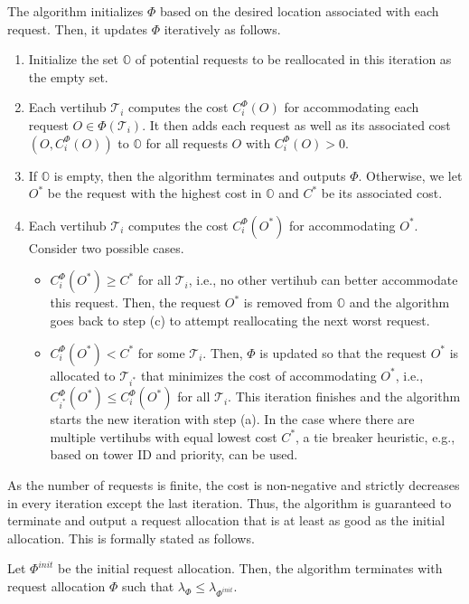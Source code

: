 The algorithm initializes $\Phi$ based on the desired location associated with each request. Then, it updates $\Phi$ iteratively as follows.
\begin{enumerate}
	\item Initialize the set $\mathbb{O}$ of potential requests to be reallocated in this iteration as the empty set.
	\item Each vertihub $\mathcal{T}_i$ computes the cost $C_i^\Phi(O)$ for accommodating each request $O \in \Phi(\mathcal{T}_i)$. It then adds each request as well as its associated cost $(O, C_i^\Phi(O))$ to $\mathbb{O}$ for all requests $O$ with $C_i^\Phi(O) > 0$.
	\item If $\mathbb{O}$ is empty, then the algorithm terminates and outputs $\Phi$. Otherwise, we let $O^*$ be the request with the highest cost in $\mathbb{O}$ and $C^*$ be its associated cost.
	\item Each vertihub $\mathcal{T}_i$ computes the cost $C_i^\Phi(O^*)$ for accommodating $O^*$. Consider two possible cases.
	\begin{itemize}
		\item $C_i^\Phi(O^*) \geq C^*$ for all $\mathcal{T}_i$, i.e., no other vertihub can better accommodate this request. Then, the request $O^*$ is removed from $\mathbb{O}$ and the algorithm goes back to step (c) to attempt reallocating the next worst request.
		\item $C_i^\Phi(O^*) < C^*$ for some $\mathcal{T}_i$. Then, $\Phi$ is updated so that the request $O^*$ is allocated to $\mathcal{T}_{i^*}$ that minimizes the cost of accommodating $O^*$, i.e., $C_{i^*}^\Phi(O^*) \leq C_i^\Phi(O^*)$ for all $\mathcal{T}_i$. This iteration finishes and the algorithm starts the new iteration with step (a). In the case where there are multiple vertihubs with equal lowest cost $C^{\ast}$, a tie breaker heuristic, e.g., based on tower ID and priority, can be used.
	\end{itemize}
\end{enumerate}

As the number of requests is finite, the cost is non-negative and strictly decreases in every iteration except the last iteration.  Thus, the algorithm is guaranteed to terminate and output a request allocation that is at least as good as the initial allocation.  This is formally stated as follows.

\begin{prop}
	Let $\Phi^{init}$ be the initial request allocation. Then, the algorithm terminates with request allocation $\Phi$ such that $\lambda_{\Phi} \leq \lambda_{\Phi^{init}}$.
	
\end{prop}

